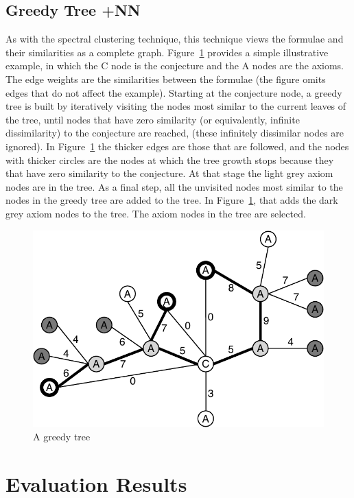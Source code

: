 \documentclass[EPiC]{easychair}
\begin{document}
\subsection{Greedy Tree +NN}
\label{Zihao}

As with the spectral clustering technique, this technique views the formulae
and their similarities as a complete graph.
Figure~\ref{GreedyTree} provides a simple illustrative example, in which
the {\sf C} node is the conjecture and the {\sf A} nodes are the axioms.
The edge weights are the similarities between the formulae (the figure
omits edges that do not affect the example).
Starting at the conjecture node, a greedy tree is built by iteratively 
visiting the nodes most similar to the current leaves of the tree, until 
nodes that have zero similarity (or equivalently, infinite dissimilarity) 
to the conjecture are reached, (these infinitely dissimilar nodes are 
ignored).
In Figure~\ref{GreedyTree} the thicker edges are those that are followed,
and the nodes with thicker circles are the nodes at which the tree growth 
stops because they that have zero similarity to the conjecture.
At that stage the light grey axiom nodes are in the tree.
As a final step, all the unvisited nodes most similar to the nodes in the 
greedy tree are added to the tree.
In Figure~\ref{GreedyTree}, that adds the dark grey axiom nodes to the 
tree.
The axiom nodes in the tree are selected.

\begin{figure}[h]
\centering
\includegraphics[width=0.5\linewidth]{GreedyTree+NN.pdf}
\caption{A greedy tree}
\label{GreedyTree}
\end{figure}

\section{Evaluation Results}
\label{Results}
\end{document}
